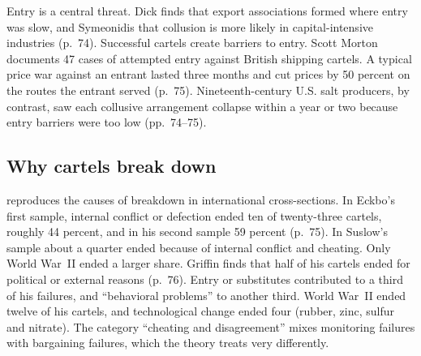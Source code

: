 Entry is a central threat. Dick finds that export associations formed where entry was slow, and Symeonidis that
collusion is more likely in capital-intensive industries (p.~74). Successful cartels create barriers to entry. Scott
Morton documents 47 cases of attempted entry against British shipping cartels. A typical price war against an entrant
lasted three months and cut prices by 50 percent on the routes the entrant served (p.~75). Nineteenth-century U.S. salt
producers, by contrast, saw each collusive arrangement collapse within a year or two because entry barriers were too
low (pp.~74--75).

\subsection{Why cartels break down}\label{sec:12-ls-breakdown-causes}

 reproduces the causes of breakdown in international cross-sections. In Eckbo's first
sample, internal conflict or defection ended ten of twenty-three cartels, roughly 44 percent, and in his second sample
59 percent (p.~75). In Suslow's sample about a quarter ended because of internal conflict and cheating. Only World
War~II ended a larger share. Griffin finds that half of his cartels ended for political or external reasons
(p.~76). Entry or substitutes contributed to a third of his failures, and ``behavioral problems'' to another third. World War~II ended twelve of his cartels, and technological change ended four (rubber, zinc, sulfur and
nitrate). The category ``cheating and disagreement'' mixes monitoring failures with bargaining failures, which the
theory treats very differently.

